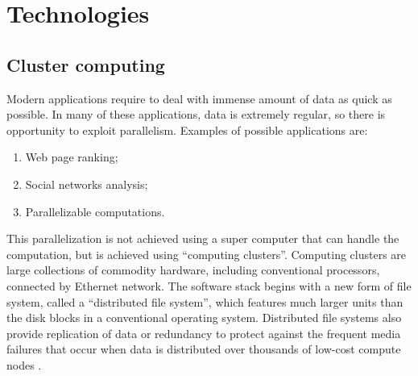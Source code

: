 \documentclass[\main/main.tex]{subfiles}
\begin{document}
\chapter{Technologies}
\section{Cluster computing}
Modern applications require to deal with immense amount of data as quick as possible. In many of these applications, data is extremely regular, so there is opportunity to exploit parallelism. Examples of possible applications are:
\begin{enumerate}
    \item Web page ranking;
    \item Social networks analysis;
    \item Parallelizable computations.
\end{enumerate}
This parallelization is not achieved using a super computer that can handle the computation, but is achieved using ``computing clusters''. Computing clusters are large collections of commodity hardware, including conventional processors, connected by Ethernet network. The software stack begins with a new form of file system, called a ``distributed file system'', which features much larger units than the disk blocks in a conventional operating system. Distributed file systems also provide replication of data or redundancy to protect against the frequent media failures that occur when data is distributed over thousands of low-cost compute nodes \cite{leskovec_rajaraman_ullman_2020}.
\end{document}
